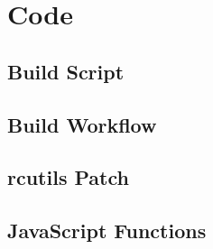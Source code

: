 \chapter{Code}

\section{Build Script}\label{sec:apxblasm}

    

    \pagebreak

\section{Build Workflow}\label{sec:apxworkflow}

    

    \pagebreak

\section{rcutils Patch}\label{sec:apxpatch}

    

    \pagebreak

\section{JavaScript Functions}\label{sec:apxmodule}

    

    \pagebreak


%         

%         

